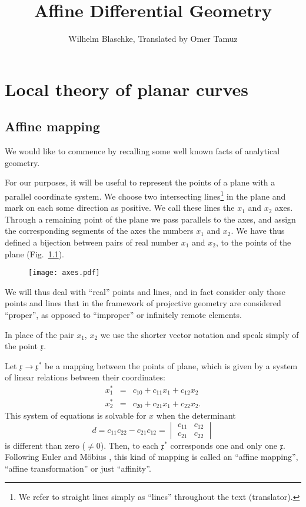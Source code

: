 \documentclass[11pt]{book} \usepackage{amssymb}
\newcommand{\myvec}[1]{\mathfrak{#1}}
\newcommand{\vecx}{\myvec{x}}
\begin{document}
\title{Affine Differential Geometry}

 \author{Wilhelm Blaschke, Translated by Omer Tamuz}
\maketitle

\chapter{Local theory of planar curves}
\section{Affine mapping}
We would like to commence by recalling some well known facts of analytical 
geometry.

For our purposes, it will be useful to represent the points of a plane with
a parallel coordinate system. We choose two intersecting lines\footnote{We
refer to straight lines simply as ``lines'' throughout the text (translator).}
in the plane and mark on each some direction as positive. We call these lines
the $x_1$ and $x_2$ axes. Through a remaining point of the plane we pass
parallels to the axes, and assign the corresponding segments of the axes 
the numbers $x_1$ and $x_2$. We have thus defined a bijection between 
pairs of real number $x_1$ and $x_2$, to the points of the plane 
(Fig.~\ref{fig:axes}).

\begin{figure}[htp]
  \label{fig:axes}
  \centering
  \texttt{[image: axes.pdf]} 
  \caption{}
\end{figure}

We will thus deal with ``real'' points and lines, and in fact consider only
those points and lines that in the framework of projective geometry are 
considered ``proper'', as opposed to ``improper'' or infinitely remote elements.

In place of the pair $x_1$, $x_2$ we use the shorter vector notation and 
speak simply of the point $\vecx$.

Let $\vecx\to \vecx^*$ be a mapping between the points of plane,
which is given by a system of linear relations between their coordinates:
\begin{equation}
  \label{eq:affine_trans}
  \begin{array}{rcl}
    x_1^* &=& c_{10}+c_{11}x_1+c_{12}x_2\\
    x_2^* &=& c_{20}+c_{21}x_1+c_{22}x_2.
  \end{array}
\end{equation}
This system of equations is solvable for $x$ when the determinant 
\begin{equation}
  d=c_{11}c_{22}-c_{21}c_{12}=
  \begin{vmatrix}
    c_{11} & c_{12}\\
    c_{21} & c_{22}
  \end{vmatrix}
\end{equation}
is different than zero ($\neq 0$). Then, to each $\vecx^*$ corresponds 
one and only one $\vecx$. Following Euler \cite{Euler:1749} and 
M\"obius \cite{Mobius:1827}, this kind of mapping
is called an ``affine mapping'', ``affine transformation'' or just ``affinity''.
 
\end{document}
